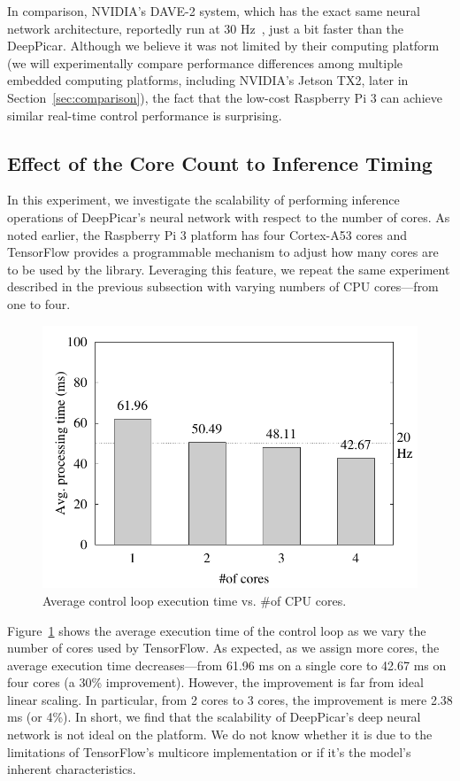 In comparison, NVIDIA's DAVE-2 system, which has the exact same neural
network architecture, reportedly run at 30 Hz~\cite{Bojarski2016},
just a bit faster than the DeepPicar. Although we believe it was not
limited by their computing platform (we will experimentally compare
performance differences among multiple embedded computing platforms,
including NVIDIA's Jetson TX2, later in
Section~\ref{sec:comparison}), the fact that the low-cost
Raspberry Pi 3 can achieve similar real-time control performance is
surprising.

\subsection{Effect of the Core Count to Inference Timing}

In this experiment, we investigate the scalability of performing
inference operations of DeepPicar's neural network with respect to the
number of cores. As noted earlier, the Raspberry Pi 3 platform has
four Cortex-A53 cores and TensorFlow 
provides a programmable mechanism to adjust how many cores are to be
used by the library. Leveraging this feature, we repeat the
same experiment described in the previous subsection with varying
numbers of CPU cores---from one to four.


\begin{figure}[h]
  \centering
  \includegraphics[width=.45\textwidth]{figs/perf_vs_corecnt}
  \caption{Average control loop execution time vs. \#of CPU
    cores.}
  \label{fig:perf-vs-corecnt}
\end{figure}

Figure~\ref{fig:perf-vs-corecnt} shows the average execution time of
the control loop as we vary the number of cores used by
TensorFlow. As expected, as we assign more cores, the average execution
time decreases---from 61.96 ms on a single core to 42.67 ms on four
cores (a 30\% improvement). However, the improvement is far from ideal
linear scaling. In particular, from 2 cores to 3 cores, the
improvement is mere 2.38 ms (or 4\%). In short, we find that the
scalability of DeepPicar's deep neural network is not ideal on the
platform. We do not know whether it is due to the limitations of
TensorFlow's multicore implementation or if it's the model's inherent
characteristics. 

